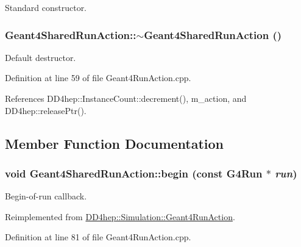 Standard constructor. \hypertarget{class_d_d4hep_1_1_simulation_1_1_geant4_shared_run_action_a519c22826231728b12792015e2a96837}{
\subsubsection[{$\sim$Geant4SharedRunAction}]{\setlength{\rightskip}{0pt plus 5cm}Geant4SharedRunAction::$\sim$Geant4SharedRunAction ()}}
\label{class_d_d4hep_1_1_simulation_1_1_geant4_shared_run_action_a519c22826231728b12792015e2a96837}


Default destructor. 

Definition at line 59 of file Geant4RunAction.cpp.

References DD4hep::InstanceCount::decrement(), m\_\-action, and DD4hep::releasePtr().

\subsection{Member Function Documentation}
\hypertarget{class_d_d4hep_1_1_simulation_1_1_geant4_shared_run_action_a8206dc20bbe8ace921f4e97c7159872a}{
\subsubsection[{begin}]{\setlength{\rightskip}{0pt plus 5cm}void Geant4SharedRunAction::begin (const G4Run $\ast$ {\em run})}}
\label{class_d_d4hep_1_1_simulation_1_1_geant4_shared_run_action_a8206dc20bbe8ace921f4e97c7159872a}


Begin-\/of-\/run callback. 

Reimplemented from \hyperlink{class_d_d4hep_1_1_simulation_1_1_geant4_run_action_aeea4684e5d27e039b26734c3dbf3f65b}{DD4hep::Simulation::Geant4RunAction}.

Definition at line 81 of file Geant4RunAction.cpp.

